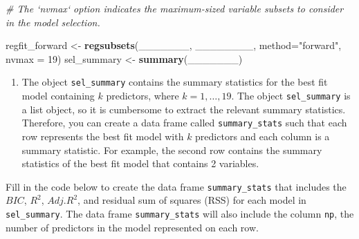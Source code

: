 \documentclass[]{book}
\newenvironment{Shaded}{\begin{snugshade}}{\end{snugshade}}
\newcommand{\KeywordTok}[1]{\textcolor[rgb]{0.13,0.29,0.53}{\textbf{#1}}}
\newcommand{\DataTypeTok}[1]{\textcolor[rgb]{0.13,0.29,0.53}{#1}}
\newcommand{\DecValTok}[1]{\textcolor[rgb]{0.00,0.00,0.81}{#1}}
\newcommand{\StringTok}[1]{\textcolor[rgb]{0.31,0.60,0.02}{#1}}
\newcommand{\CommentTok}[1]{\textcolor[rgb]{0.56,0.35,0.01}{\textit{#1}}}
\newcommand{\OperatorTok}[1]{\textcolor[rgb]{0.81,0.36,0.00}{\textbf{#1}}}
\newcommand{\NormalTok}[1]{#1}
\providecommand{\tightlist}{%
  \setlength{\itemsep}{0pt}\setlength{\parskip}{0pt}}
\begin{document}
\begin{Shaded}
\begin{Highlighting}[]
\CommentTok{# The `nvmax` option indicates the maximum-sized variable subsets to consider in the model selection.}
\end{Highlighting}
\end{Shaded}

\begin{Shaded}
\begin{Highlighting}[]
\NormalTok{regfit_forward <-}\StringTok{ }\KeywordTok{regsubsets}\NormalTok{(_______, ________, }\DataTypeTok{method=}\StringTok{"forward"}\NormalTok{, }\DataTypeTok{nvmax =} \DecValTok{19}\NormalTok{)}
\NormalTok{sel_summary <-}\StringTok{ }\KeywordTok{summary}\NormalTok{(_______)}
\end{Highlighting}
\end{Shaded}

\begin{enumerate}
\def\labelenumi{\arabic{enumi}.}
\setcounter{enumi}{9}
\tightlist
\item
  The object \texttt{sel\_summary} contains the summary statistics for
  the best fit model containing \(k\) predictors, where
  \(k = 1, \ldots, 19\). The object \texttt{sel\_summary} is a list
  object, so it is cumbersome to extract the relevant summary
  statistics. Therefore, you can create a data frame called
  \texttt{summary\_stats} such that each row represents the best fit
  model with \(k\) predictors and each column is a summary statistic.
  For example, the second row contains the summary statistics of the
  best fit model that contains 2 variables.
\end{enumerate}

Fill in the code below to create the data frame \texttt{summary\_stats}
that includes the \(BIC\), \(R^2\), \(Adj. R^2\), and residual sum of
squares (RSS) for each model in \texttt{sel\_summary}. The data frame
\texttt{summary\_stats} will also include the column \texttt{np}, the
number of predictors in the model represented on each row.

\begin{Shaded}
\end{Shaded}
\end{document}
